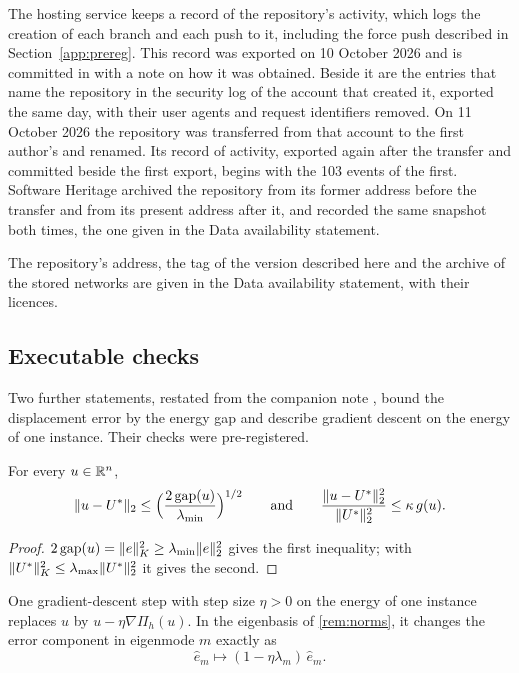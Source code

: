 The hosting service keeps a record of the repository's activity, which logs the creation of
each branch and each push to it, including the force push described in
Section~\ref{app:prereg}. This record was exported on 10 October 2026 and is committed in  with a note
on how it was obtained. Beside it are the entries that name the repository in the security
log of the account that created it, exported the same day, with their user agents and
request identifiers removed. On 11 October 2026 the repository was transferred from that
account to the first author's and renamed. Its record of activity, exported again after the
transfer and committed beside the first export, begins with the 103 events of the first. Software Heritage archived the repository from its former address before the transfer
and from its present address after it, and recorded the same snapshot both times, the one given
in the Data availability statement.

The repository's address, the tag of the version described here and the archive of the
stored networks are given in the Data availability statement, with their licences.

\subsection{Executable checks}\label{app:repro:checks}

Two further statements, restated from the companion note \cite{CaoSong2026}, bound the
displacement error by the energy gap and describe gradient descent on the energy of one instance. Their checks were pre-registered.

\begin{lemma}[Conditioning]\label{lem:cond}
For every $u\in\mathbb{R}^{n}$,
\begin{equation}
\lVert u-U^{\ast}\rVert_2 \le \Bigl(\frac{2\operatorname{gap}(u)}{\lambda_{\min}}\Bigr)^{1/2}
\qquad\text{and}\qquad
\frac{\lVert u-U^{\ast}\rVert_2^{2}}{\lVert U^{\ast}\rVert_2^{2}} \le \kappa\, g(u).
\label{eq:cond}
\end{equation}
\end{lemma}

\begin{proof}
$2\operatorname{gap}(u)=\lVert e\rVert_K^2\ge\lambda_{\min}\lVert e\rVert_2^2$ gives the first inequality; with
$\lVert U^{\ast}\rVert_K^2\le\lambda_{\max}\lVert U^{\ast}\rVert_2^2$ it gives the second.
\end{proof}

\begin{corollary}\label{cor:modes}
One gradient-descent step with step size $\eta>0$ on the energy of one instance replaces
$u$ by $u-\eta\nabla\Pi_h(u)$. In the eigenbasis of \cref{rem:norms}, it changes the error
component in eigenmode $m$ exactly as
\begin{equation}
\hat e_m \mapsto (1-\eta\lambda_m)\,\hat e_m .
\label{eq:modes}
\end{equation}
\end{corollary}

